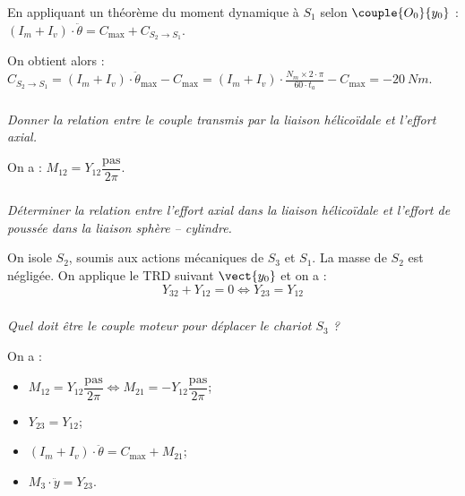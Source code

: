 \begin{multicols}{2}
\begin{corrige}
En appliquant un théorème du moment dynamique à $S_1$ selon $\couple{O_0}{{y}_0}$ :
$(I_m+I_v)\cdot \ddot{\theta}=C_{\text{max}}+C_{S_2\to S_1}$. 

On obtient alors : 
$C_{S_2\to S_1}=(I_m+I_v)\cdot \ddot{\theta}_{\text{max}}-C_{\text{max}}=(I_m+I_v)\cdot \frac{N_m\times 2\cdot \pi}{60\cdot t_a}-C_{\text{max}}=-\SI{20}{Nm}$.



\end{corrige}
\else
\fi


\subparagraph{}
\textit{Donner la relation entre le couple transmis par la liaison hélicoïdale et l'effort axial.}
\ifprof
\begin{corrige}
On a : $M_{12}=Y_{12}\dfrac{\text{pas}}{2\pi}$.
\end{corrige}
\else
\fi
\subparagraph{}
\textit{Déterminer la relation entre l'effort axial dans la liaison hélicoïdale et l'effort de poussée dans la liaison sphère -- cylindre.}
\ifprof
\begin{corrige}
On isole $S_2$, soumis aux actions mécaniques de $S_3$ et $S_1$. La masse de $S_2$ est négligée. 
On applique le TRD suivant $\vect{y_0}$ et on a : 
$$
Y_{32}+Y_{12}=0 \Leftrightarrow 
Y_{23}=Y_{12}
$$
\end{corrige}
\else
\fi


\subparagraph{}
\textit{Quel doit être le couple moteur pour déplacer le chariot $S_3$ ?}
\ifprof
\begin{corrige}
On a : 
\begin{itemize}
\item $M_{12}=Y_{12}\dfrac{\text{pas}}{2\pi} \Leftrightarrow M_{21}=-Y_{12}\dfrac{\text{pas}}{2\pi}$;
\item $Y_{23}=Y_{12}$;
\item $(I_m+I_v)\cdot \ddot{\theta}=C_{\text{max}}+M_{21}$;
\item $M_3\cdot \ddot{y}=Y_{23}$.
\end{itemize}


\end{corrige}
\end{multicols}
